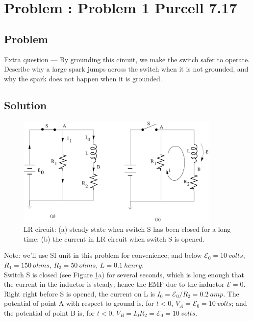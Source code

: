 \documentclass[solutions]{esg8022pset}
\date{\today }
\begin{document}
\section{Problem \thesection: Problem 1 Purcell 7.17}
\subsection{Problem}
 Extra question --- By grounding this circuit, we make the switch
safer to operate. Describe why a large spark jumps across the switch
when it is not grounded, and why the spark does not happen when it is
grounded.
\subsection{Solution}


\begin{figure}[H]
    \centering
    \includegraphics[width = 10cm]{inductance2}
    \caption{LR circuit: (a) steady state when switch S has been closed for a
long time; (b) the current in LR circuit when switch S is opened.}
    \label{fig:inductance2.eps}
  \end{figure}




Note: we'll use SI unit in this problem for convenience; and below
${\mathcal{E}}_0=10\:volts$, $R_1=150\:ohms$, $R_2=50\:ohms$,
$L=0.1\:henry$.\\

Switch S is closed (see Figure \ref{fig:inductance2.eps}a) for several
seconds, which is long enough that the current in the inductor is
steady; hence the EMF due to the inductor ${\mathcal{E}}=0$.  Right
right before S is opened, the current on L is $I_0 =
{\mathcal{E}}_0/R_2 = 0.2\:amp$.  The potential of point A with
respect to ground is, for $t<0$, $V_A = {\mathcal{E}}_0 = 10\:volts$;
and the potential of point B is, for $t<0$, $V_B=I_0 R_2=
{\mathcal{E}}_0=10\:volts$.\\
\end{document}
